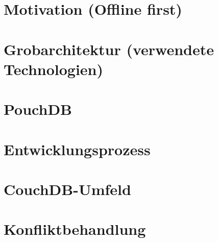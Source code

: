 
%
%

\section{Motivation (Offline first)}

\section{Grobarchitektur (verwendete Technologien)}

\section{PouchDB}

\section{Entwicklungsprozess}

\section{CouchDB-Umfeld}

\section{Konfliktbehandlung}